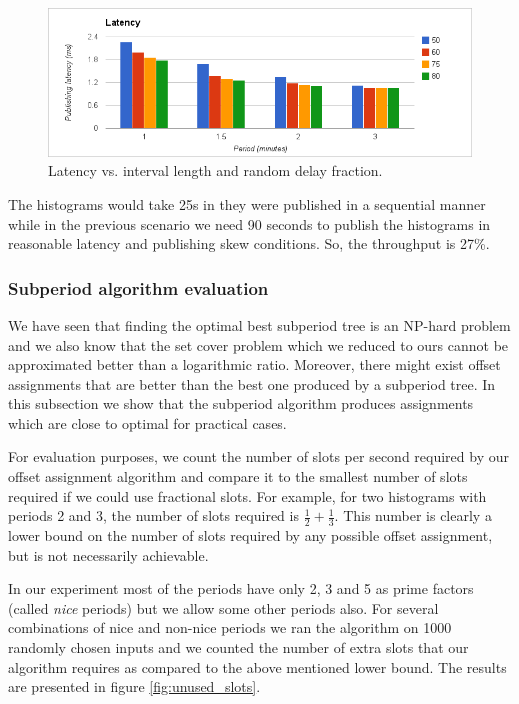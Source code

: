 \begin{figure}[ht]
\centering
\includegraphics[scale=0.5]{Images/latency_sim.png}
\caption{Latency vs. interval length and random delay fraction.}
\label{fig:latency_sim}
\end{figure}

The histograms would take 25s in they were published in a sequential manner while in the previous scenario we need 90 seconds to publish the histograms in reasonable latency and publishing skew conditions. So, the throughput is 27\%.


\subsubsection*{Subperiod algorithm evaluation}

We have seen that finding the optimal best subperiod tree is an NP-hard problem and we also know that the set cover problem which we reduced to ours cannot be approximated better than a logarithmic ratio. Moreover, there might exist offset assignments that are better than the best one produced by a subperiod tree. In this subsection we show that the subperiod algorithm produces assignments which are close to optimal for practical cases. 

For evaluation purposes, we count the number of slots per second required by our offset assignment algorithm and compare it to the smallest number of slots required if we could use fractional slots. For example, for two histograms with periods 2 and 3, the number of slots required is $\frac 1 2 + \frac 1 3$. This number is clearly a lower bound on the number of slots required by any possible offset assignment, but is not necessarily achievable.

In our experiment most of the periods have only 2, 3 and 5 as prime factors (called \emph{nice} periods) but we allow some other periods also. For several combinations of nice and non-nice periods we ran the algorithm on 1000 randomly chosen inputs and we counted the number of extra slots that our algorithm requires as compared to the above mentioned lower bound. The results are presented in figure \ref{fig:unused_slots}.

